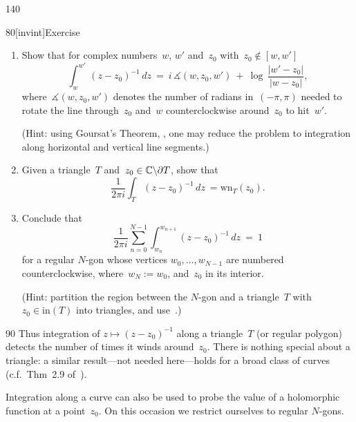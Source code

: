 \begin{parsec}{140}
\begin{point}{80}[invint]{Exercise}
\begin{enumerate}
\begin{alignat*}{3}
	\ +\ 
	\int_0^b \frac{t}{a^2+t^2}\,dt\\
	\ &=\ 
	\textstyle
	i\,\arctan(\,b/a\,)
	\,+\, \log\left|a+ib\right| - \log\left|ia\right|,
\end{alignat*}
and similarly, show that for real numbers~$a$ and $b\neq 0$
\begin{equation*}
	\int_{a+ib}^{ib} z^{-1}\,dz
	\ = \ 
	i\arctan(\,a/b\,) \ +\ 
	\log\left|ib\right| \,-\,
	\log\left|a+ib\right|.
\end{equation*}
	\item
Show that for complex numbers~$w$, $w'$ and~$z_0$
with~$z_0\notin [w,w']$
\begin{equation*}
	\int_{w}^{w'}\,(z-z_0)^{-1}\,dz
\ = \ 
i\, \measuredangle(w,z_0,w')\ +\ 
\log\,\frac{\left|w'-z_0\right|}{\left|w-z_0\right|},
\end{equation*}
where~$\measuredangle(w,z_0,w')$
denotes
the number of radians
in~$(-\pi,\pi)$
needed
to rotate the line through~$z_0$ and~$w$
counterclockwise around~$z_0$ to hit~$w'$.

(Hint: 
using Goursat's Theorem, ,
one may reduce the problem
to integration along horizontal and vertical line segments.)
\item
Given a triangle~$T$ and~$z_0\in\mathbb{C}\backslash \partial T$,
show that
\begin{equation*}
	\frac{1}{2\pi i}\int_T (z-z_0)^{-1}\,dz
	\ =  \mathrm{wn}_T(z_0).
\end{equation*}%
\item
Conclude that
\begin{equation*}
	\frac{1}{2\pi i}\sum_{n=0}^{N-1}\int_{w_n}^{w_{n+1}}(z-z_0)^{-1}\,dz
	\ = \ 1
\end{equation*}
for a regular $N$-gon whose vertices $w_0,\dotsc,w_{N-1}$
are numbered counterclockwise,
where~$w_N:=w_0$,
and~$z_0$ in its interior.

(Hint: partition the region between the $N$-gon
and a triangle~$T$ with~$z_0\in\mathrm{in}(T)$
into triangles, and use~.)
\end{enumerate}%
\spacingfix{}%
\end{point}%
\begin{point}{90}%
Thus integration of 
$z\mapsto (z-z_0)^{-1}$
along a triangle~$T$ (or regular polygon) detects
the number of times it winds
around~$z_0$.
There is nothing special about a triangle:
a similar result---not needed here---holds
for a broad class of curves
(c.f.~Thm~2.9 of~\cite{conway2013}).

Integration along a curve can also be used
to probe the value of a holomorphic function at a point~$z_0$.
On this occasion
we restrict ourselves
to regular $N$-gons.
\end{point}
\end{parsec}%
